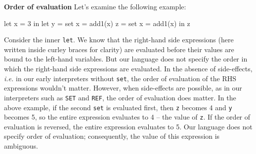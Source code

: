 \begin{minipage}[t]{\sw}
\slidenumber
\LARGE
{\bf Order of evaluation}\exx
\Large
Let's examine the following example:
\begin{qv}
let
  x = 3
in
  let
    y = {set x = add1(x)}
    z = {set x = add1(x)}
  in
    z
\end{qv}
Consider the inner \verb'let'.
We know that the right-hand side expressions
(here written inside curley braces for clarity)
are evaluated before their values are bound
to the left-hand variables.
But our language does not specify the order
in which the right-hand side expressions are evaluated.\exx
In the absence of side-effects,
{\em i.e.} in our early interpreters without \verb'set',
the order of evaluation of the RHS expressions wouldn't matter.
However, when side-effects are possible,
as in our interpreters such as \verb'SET' and \verb'REF',
the order of evaluation does matter.\exx
In the above example, if the second \verb'set' is evaluated first,
then \verb'z' becomes 4 and \verb'y' becomes 5,
so the entire expression evaluates to 4 -- the value of \verb'z'.
If the order of evaluation is reversed,
the entire expression evaluates to 5.
Our language does not specify order of evaluation;
consequently, the value of this expression is ambiguous.
\end{minipage}

